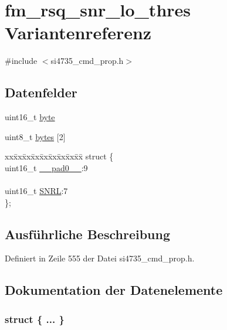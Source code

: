 \hypertarget{unionfm__rsq__snr__lo__thres}{}\section{fm\+\_\+rsq\+\_\+snr\+\_\+lo\+\_\+thres Variantenreferenz}
\label{unionfm__rsq__snr__lo__thres}


{\ttfamily \#include $<$si4735\+\_\+cmd\+\_\+prop.\+h$>$}

\subsection*{Datenfelder}
\begin{DoxyCompactItemize}
\item 
uint16\+\_\+t \hyperlink{unionfm__rsq__snr__lo__thres_ab0549c1b5ea980a02e7eab77e21fea49}{byte}
\item 
uint8\+\_\+t \hyperlink{unionfm__rsq__snr__lo__thres_a46e4c05d20a047ec169f60d3167e912e}{bytes} \mbox{[}2\mbox{]}
\item 
\begin{tabbing}
xx\=xx\=xx\=xx\=xx\=xx\=xx\=xx\=xx\=\kill
struct \{\\
\>uint16\_t \hyperlink{unionfm__rsq__snr__lo__thres_a77132c2c26a75f5b8751b235cda23828}{\_\_pad0\_\_}:9\\
\>\\
\>uint16\_t \hyperlink{unionfm__rsq__snr__lo__thres_a78a9e0c1e70e64406ad160b491c6a7de}{SNRL}:7\\
\}; \\

\end{tabbing}\end{DoxyCompactItemize}


\subsection{Ausführliche Beschreibung}


Definiert in Zeile 555 der Datei si4735\+\_\+cmd\+\_\+prop.\+h.



\subsection{Dokumentation der Datenelemente}
\hypertarget{unionfm__rsq__snr__lo__thres_af4e3800b63bf8ce30e0fd25eb5631971}{}\subsubsection[{"@61}]{\setlength{\rightskip}{0pt plus 5cm}struct \{ ... \} }\label{unionfm__rsq__snr__lo__thres_af4e3800b63bf8ce30e0fd25eb5631971}
\hypertarget{unionfm__rsq__snr__lo__thres_a77132c2c26a75f5b8751b235cda23828}{}
